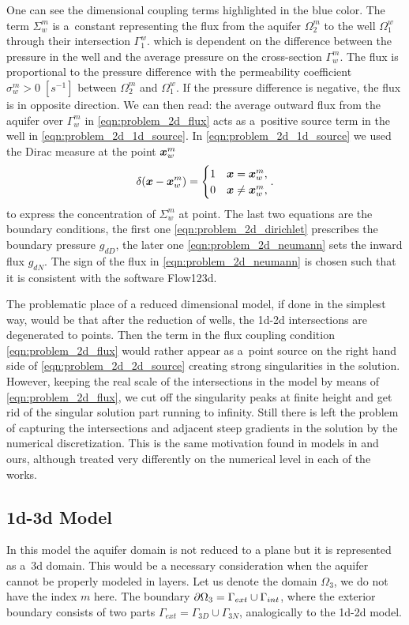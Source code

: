 One can see the dimensional coupling terms highlighted in the blue color.
The term $\Sigma^m_w$ is a~constant representing the flux from the aquifer $\Omega^m_2$ to the well $\Omega^w_1$
through their intersection $\Gamma^w_1$. 
which is dependent on the difference between the pressure in the well and the average pressure on the cross-section $\Gamma^m_w$.
The flux is proportional to the pressure difference with the permeability coefficient $\sigma^m_w>0\;[s^{-1}]$ between $\Omega^m_2$ and $\Omega^w_1$.
If the pressure difference is negative, the flux is in opposite direction.
We can then read: the average outward flux from the aquifer
over $\Gamma^m_w$ in \eqref{eqn:problem_2d_flux} acts as a~positive source term in the well in \eqref{eqn:problem_2d_1d_source}.
In \eqref{eqn:problem_2d_1d_source} we used the Dirac measure at the point $\mathbf{\boldsymbol{x}}^m_w$
\[
    \delta(\mathbf{\boldsymbol{x}} - \mathbf{\boldsymbol{x}}^m_w) = 
    \begin{cases}
        1 & \mathbf{\boldsymbol{x}} = \mathbf{\boldsymbol{x}}^m_w, \\
        0 & \mathbf{\boldsymbol{x}} \neq \mathbf{\boldsymbol{x}}^m_w,
    \end{cases}.
\]
to express the concentration of $\Sigma^m_w$ at point.
The last two equations are the boundary conditions, the first one \eqref{eqn:problem_2d_dirichlet} prescribes the boundary pressure $g_{dD}$, 
the later one \eqref{eqn:problem_2d_neumann} sets the inward flux $g_{dN}$. The sign of the flux in \eqref{eqn:problem_2d_neumann}
is chosen such that it is consistent with the software Flow123d.

The problematic place of a reduced dimensional model, if done in the simplest way, would be that after the reduction of wells,
the 1d-2d intersections are degenerated to points. Then the term in the flux coupling condition \eqref{eqn:problem_2d_flux} would rather
appear as a~point source on the right hand side of \eqref{eqn:problem_2d_2d_source} creating strong singularities in the solution.
However, keeping the real scale of the intersections in the model by means of \eqref{eqn:problem_2d_flux}, we cut off the singularity peaks
at finite height and get rid of the singular solution part running to infinity.
Still there is left the problem of capturing the intersections and adjacent steep gradients in the solution by the numerical discretization.
This is the same motivation found in models in \cite{gracie_modelling_2010,craig_using_2011,koppl_vidotto_2018} and ours,
although treated very differently on the numerical level in each of the works.

\subsection{1d-3d Model}
In this model the aquifer domain is not reduced to a plane but it is represented as a~3d domain.
This would be a necessary consideration when the aquifer cannot be properly modeled in layers.
Let us denote the domain $\Omega_3$, we do not have the index $m$ here.
The boundary $\partial\Omega_3 = \Gamma_{ext} \cup \Gamma_{int}$,
where the exterior boundary consists of two parts $\Gamma_{ext} = \Gamma_{3D} \cup \Gamma_{3N}$,
analogically to the 1d-2d model.

